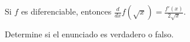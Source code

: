 \item Si $f$ es diferenciable, entonces $\frac{d}{dx} f(\sqrt{x}) = \frac{f'(x)}{2\sqrt{x}}$.
\par
Determine si el enunciado es verdadero o falso.
